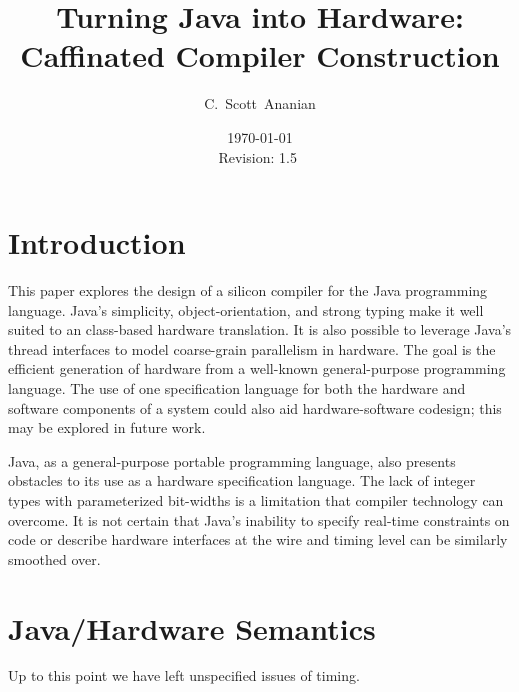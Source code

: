 \documentclass[10pt,notitlepage,twocolumn]{article}
\author{C.~Scott~Ananian}
\title{Turning Java into Hardware: \\ Caffinated Compiler Construction}
\date{\today \\ $ $Revision: 1.5 $ $}
\begin{document}

\maketitle

\section{Introduction}
This paper explores the design of a silicon compiler for the Java
programming language.  Java's simplicity, object-orientation, and
strong typing make it well suited to an class-based hardware
translation.  It is also possible to leverage Java's thread interfaces
to model coarse-grain parallelism in hardware.  The goal is the
efficient generation of hardware from a well-known general-purpose
programming language.  The use of one specification language for both
the hardware and software components of a system could also aid
hardware-software codesign; this may be explored in future work.

Java, as a general-purpose portable programming language, also
presents obstacles to its use as a hardware specification language.
The lack of integer types with parameterized bit-widths is a
limitation that compiler technology can overcome.  It is not certain
that Java's inability to specify real-time constraints on code or
describe hardware interfaces at the wire and timing level can be
similarly smoothed over.

\section{Java/Hardware Semantics}

Up to this point we have left unspecified issues of timing.
\end{document}
